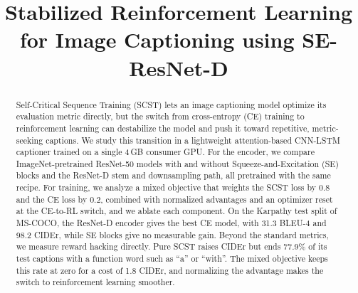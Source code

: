 \documentclass[conference]{IEEEtran}
\begin{document}
\title{Stabilized Reinforcement Learning for Image Captioning using SE-ResNet-D}

\author{
\and
{}
\and
{}
}

\maketitle

\begin{abstract}
Self-Critical Sequence Training (SCST) lets an image captioning model optimize
its evaluation metric directly, but the switch from cross-entropy (CE) training
to reinforcement learning can destabilize the model and push it toward
repetitive, metric-seeking captions. We study this transition in a lightweight
attention-based CNN-LSTM captioner trained on a single 4\,GB consumer GPU.
For the encoder, we compare ImageNet-pretrained ResNet-50 models with and
without Squeeze-and-Excitation (SE) blocks and the ResNet-D stem and
downsampling path, all pretrained with the same recipe. For training, we analyze a mixed objective that weights the SCST loss by 0.8 and
the CE loss by 0.2, combined with normalized advantages and an optimizer reset
at the CE-to-RL switch, and we ablate each component. On the Karpathy test
split of MS-COCO, the ResNet-D encoder gives the best CE model, with 31.3
BLEU-4 and 98.2 CIDEr, while SE blocks give no measurable gain. Beyond the
standard metrics, we measure reward hacking directly. Pure SCST raises CIDEr
but ends 77.9\% of its test captions with a function word such as ``a'' or
``with''. The mixed objective keeps this rate at zero for a cost of 1.8 CIDEr,
and normalizing the advantage makes the switch to reinforcement learning
smoother.
\end{abstract}
\end{document}
